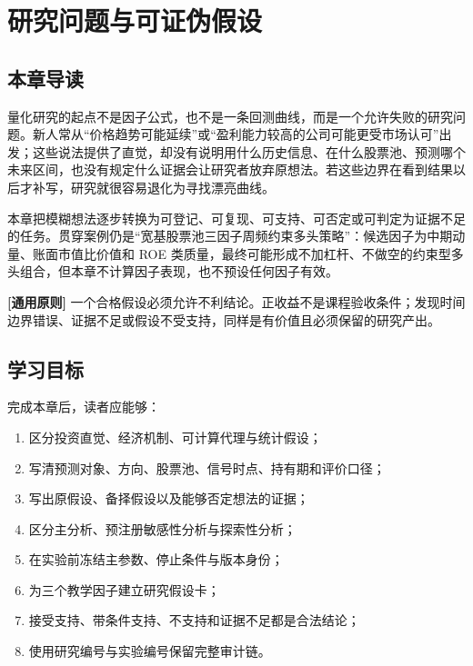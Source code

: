 \chapter{研究问题与可证伪假设}
\label{ch:hypothesis}

\section{本章导读}

量化研究的起点不是因子公式，也不是一条回测曲线，而是一个允许失败的研究问题。新人常从“价格趋势可能延续”或“盈利能力较高的公司可能更受市场认可”出发；这些说法提供了直觉，却没有说明用什么历史信息、在什么股票池、预测哪个未来区间，也没有规定什么证据会让研究者放弃原想法。若这些边界在看到结果以后才补写，研究就很容易退化为寻找漂亮曲线。

本章把模糊想法逐步转换为可登记、可复现、可支持、可否定或可判定为证据不足的任务。贯穿案例仍是“宽基股票池三因子周频约束多头策略”：候选因子为中期动量、账面市值比价值和 ROE 类质量，最终可能形成不加杠杆、不做空的约束型多头组合，但本章不计算因子表现，也不预设任何因子有效。

\begin{principlebox}
\textbf{[通用原则]} 一个合格假设必须允许不利结论。正收益不是课程验收条件；发现时间边界错误、证据不足或假设不受支持，同样是有价值且必须保留的研究产出。
\end{principlebox}

\section{学习目标}

完成本章后，读者应能够：

\begin{enumerate}
  \item 区分投资直觉、经济机制、可计算代理与统计假设；
  \item 写清预测对象、方向、股票池、信号时点、持有期和评价口径；
  \item 写出原假设、备择假设以及能够否定想法的证据；
  \item 区分主分析、预注册敏感性分析与探索性分析；
  \item 在实验前冻结主参数、停止条件与版本身份；
  \item 为三个教学因子建立研究假设卡；
  \item 接受支持、带条件支持、不支持和证据不足都是合法结论；
  \item 使用研究编号与实验编号保留完整审计链。
\end{enumerate}


